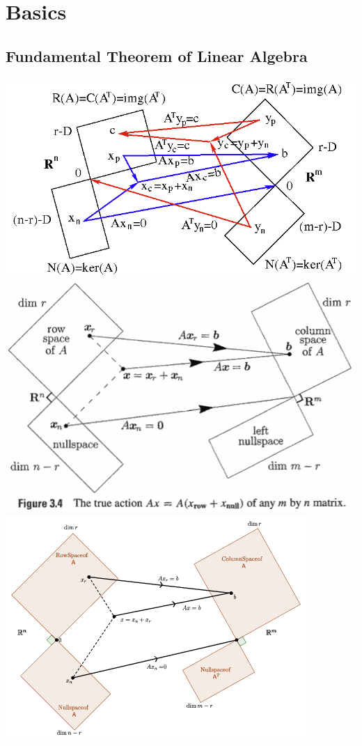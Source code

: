 \chapter{Basics}

\section{Fundamental Theorem of Linear Algebra}

\begin{center}
\includegraphics[width=\textwidth]{imgs/fund_theorem_lin_alg1.png}
\includegraphics[width=\textwidth]{imgs/fund_theorem_lin_alg2.png}
\includegraphics[width=\textwidth]{imgs/fund_theorem_lin_alg3.png}

\end{center}
